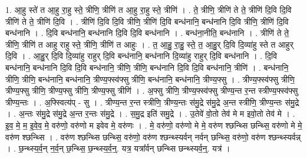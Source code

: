 \documentclass[17pt]{extarticle}
\begin{document}
1. आ॒हु स्ते॑ त आ॒हु रा॒हु स्ते॒ त्रीणि॒ त्रीणि॑ त आ॒हु रा॒हु स्ते॒ त्रीणि॑ । . ते॒ त्रीणि॒ त्रीणि॑ ते ते॒ त्रीणि॑ दि॒वि दि॒वि त्रीणि॑ ते ते॒ त्रीणि॑ दि॒वि । . त्रीणि॑ दि॒वि दि॒वि त्रीणि॒ त्रीणि॑ दि॒वि बन्ध॑नानि॒ बन्ध॑नानि दि॒वि त्रीणि॒ त्रीणि॑ दि॒वि बन्ध॑नानि । . दि॒वि बन्ध॑नानि॒ बन्ध॑नानि दि॒वि दि॒वि बन्ध॑नानि । . बन्ध॑ना॒नीति॒ बन्ध॑नानि । . त्रीणि॑ ते ते॒ त्रीणि॒ त्रीणि॑ त आहु राहु स्ते॒ त्रीणि॒ त्रीणि॑ त आहुः । . त॒ आ॒हु॒ रा॒हु॒ स्ते॒ त॒ आ॒हु॒र् दि॒वि दि॒व्या॑हु स्ते त आहुर् दि॒वि । . आ॒हु॒र् दि॒वि दि॒व्या॑हु राहुर् दि॒वि बन्ध॑नानि॒ बन्ध॑नानि दि॒व्या॑हु राहुर् दि॒वि बन्ध॑नानि । . दि॒वि बन्ध॑नानि॒ बन्ध॑नानि दि॒वि दि॒वि बन्ध॑नानि॒ त्रीणि॒ त्रीणि॒ बन्ध॑नानि दि॒वि दि॒वि बन्ध॑नानि॒ त्रीणि॑ । . बन्ध॑नानि॒ त्रीणि॒ त्रीणि॒ बन्ध॑नानि॒ बन्ध॑नानि॒ त्रीण्य॒फ्स्व॑फ्सु त्रीणि॒ बन्ध॑नानि॒ बन्ध॑नानि॒ त्रीण्य॒फ्सु । . त्रीण्य॒फ्स्व॑फ्सु त्रीणि॒ त्रीण्य॒फ्सु त्रीणि॒ त्रीण्य॒फ्सु त्रीणि॒ त्रीण्य॒फ्सु त्रीणि॑ । . अ॒फ्सु त्रीणि॒ त्रीण्य॒फ्स्व॑फ्सु त्रीण्य॒न्त र॒न्त स्त्रीण्य॒फ्स्व॑फ्सु त्रीण्य॒न्तः । . अ॒फ्स्वित्य॑प् - सु । . त्रीण्य॒न्त र॒न्त स्त्रीणि॒ त्रीण्य॒न्तः स॑मु॒द्रे स॑मु॒द्रे अ॒न्त स्त्रीणि॒ त्रीण्य॒न्तः स॑मु॒द्रे । . अ॒न्तः स॑मु॒द्रे स॑मु॒द्रे अ॒न्त र॒न्तः स॑मु॒द्रे । . स॒मु॒द्र इति॑ समु॒द्रे । . उ॒तेवे॑ वो॒तो तेव॑ मे म इवो॒तो तेव॑ मे । . इ॒व॒ मे॒ म॒ इ॒वे॒व॒ मे॒ वरु॑णो॒ वरु॑णो म इवेव मे॒ वरु॑णः । . मे॒ वरु॑णो॒ वरु॑णो मे मे॒ वरु॑ण श्छन्थ्सि छन्थ्सि॒ वरु॑णो मे मे॒ वरु॑ण श्छन्थ्सि । . वरु॑ण श्छन्थ्सि छन्थ्सि॒ वरु॑णो॒ वरु॑ण श्छन्थ्स्यर्वन् नर्वन् छन्थ्सि॒ वरु॑णो॒ वरु॑ण श्छन्थ्स्यर्वन्न् । . छ॒न्थ्स्य॒र्व॒न् न॒र्व॒न् छ॒न्थ्सि॒ छ॒न्थ्स्य॒र्व॒न्॒. यत्र॒ यत्रा᳚र्वन् छन्थ्सि छन्थ्स्यर्व॒न्॒. यत्र॑ । \newline
\end{document}
